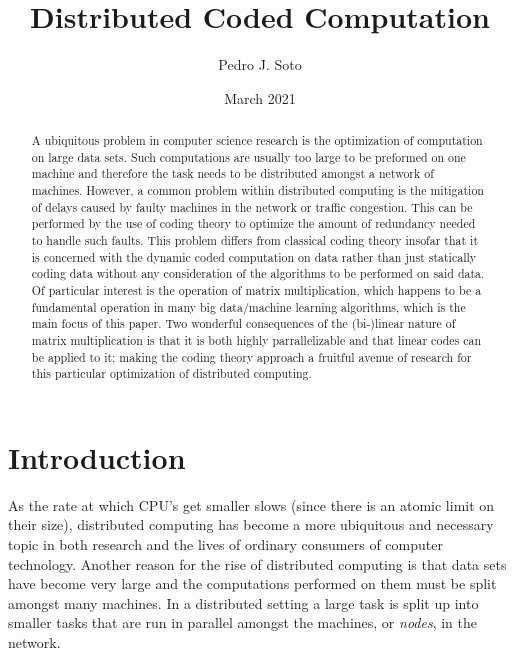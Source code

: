 \documentclass{report}
\title{Distributed Coded Computation}
\author{Pedro J. Soto}
\date{March 2021}
\begin{document}
\maketitle

\begin{abstract}
A ubiquitous problem in computer science research is the optimization of computation on large data sets. Such computations are usually too large to be preformed on one machine and therefore the task needs to be distributed amongst a network of machines. However, a common problem within distributed computing is the mitigation of delays caused by faulty machines in the network or traffic congestion. This can be performed by the use of coding theory to optimize the amount of redundancy needed to handle such faults.  This problem differs from classical coding theory insofar that it is concerned with the dynamic coded computation on data rather than just statically coding data without any consideration of the algorithms to be performed on said data. Of particular interest is the operation of matrix multiplication, which happens to be a fundamental operation in many big data/machine learning algorithms, which is the main focus of this paper. Two wonderful consequences of the (bi-)linear nature of matrix multiplication is that it is both highly parrallelizable and that linear codes can be applied to it; making the coding theory approach a fruitful avenue of research for this particular optimization of distributed computing. 
\end{abstract}

\tableofcontents



\chapter{Introduction}

As the rate at which CPU's get smaller slows (since there is an atomic limit on their size), distributed computing has become a more ubiquitous and necessary topic in both research and the lives of ordinary consumers of computer technology. 
Another reason for the rise of distributed computing is that data sets have become very large and the computations performed on them must be split amongst many machines. 
In a distributed setting a large task is split up into smaller tasks that are run in parallel amongst the machines, or \textit{nodes}, in the network. 
\end{document}
